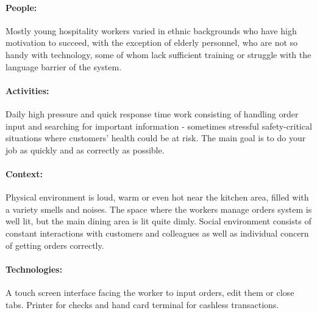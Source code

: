 \documentclass{article}
\begin{document}
\paragraph{\small People:} Mostly young hospitality workers varied in ethnic backgrounds who have high motivation to succeed, with the exception of elderly personnel, who are not so handy with technology, some of whom lack sufficient training or struggle with the language barrier of the system.
\paragraph{\small Activities:} Daily high pressure and quick response time work consisting of handling order input and searching for important information - sometimes stressful safety-critical situations where customers' health could be at risk. The main goal is to do your job as quickly and as correctly as possible.
\paragraph{\small Context:} Physical environment is loud, warm or even hot near the kitchen area, filled with a variety smells and noises. The space where the workers manage orders system is well lit, but the main dining area is lit quite dimly. Social environment consists of constant interactions with customers and colleagues as well as individual concern of getting orders correctly.
\paragraph{\small Technologies:} A touch screen interface facing the worker to input orders, edit them or close tabs. Printer for checks and hand card terminal for cashless transactions.

\end{document}
